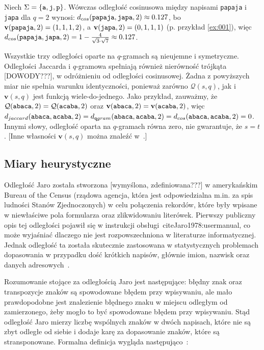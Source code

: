 \documentclass{praca1}
\begin{document}
\begin{example}
Niech $\Sigma = \{\verb|a|, \verb|j|, \verb|p|\}$. Wówczas odległość cosinusowa między napisami \verb|papaja| i \verb|japa| dla $q = 2$ wynosi: $d_{cos}(\verb|papaja|, \verb|japa|, 2) \approx 0.127$, bo $\mathbf{v}( \verb|papaja|,2) = (1, 1, 1, 2)$, a  $\mathbf{v}( \verb|japa|,2) = (0, 1, 1, 1)$ (p. przykład \ref{ex:001}), więc $d_{cos}(\verb|papaja|, \verb|japa|, 2) = 1 - \frac{4}{\sqrt{3}\cdot\sqrt{7}} \approx 0.127$.
\end{example}

Wszystkie trzy odległości oparte na $q$-gramach są nieujemne i symetryczne. Odległości Jaccarda i $q$-gramowa spełniają również nierówność trójkąta [DOWODY???], w odróżnieniu od odległości cosinusowej. Żadna z powyższych miar nie spełnia warunku identyczności, ponieważ zarówno $\mathcal{Q}(s,q)$, jak i $\mathbf{v}(s,q)$ jest funkcją wiele-do-jednego. Jako przykład, zauważmy, że $\mathcal{Q}(\verb|abaca|,2) = \mathcal{Q}(\verb|acaba|,2)$ oraz $\mathbf{v}(\verb|abaca|,2) = \mathbf{v}(\verb|acaba|,2)$, więc $d_{jaccard}(\verb|abaca|, \verb|acaba|, 2) = d_{\mathtt{q}gram}(\verb|abaca|, \verb|acaba|, 2) = d_{cos}(\verb|abaca|, \verb|acaba|, 2) = 0$. Innymi słowy, odległość oparta na $q$-gramach równa zero, nie gwarantuje, że $s = t$. [Inne własności $\mathbf{v}(s,q)$ można znaleźć w~\cite{Ukkonen1992:approxqgrams}.]


\subsection{Miary heurystyczne}

Odległość Jaro została stworzona [wymyślona, zdefiniowana???] w amerykańskim Bureau of the Census (rządowa agencja, która jest odpowiedzialna m.in. za spis ludności Stanów Zjednoczonych) w celu połączenia rekordów, które były wpisane w niewłaściwe pola formularza oraz zlikwidowaniu literówek. Pierwszy publiczny opis tej odległości pojawił się w instrukcji obsługi~cite{Jaro1978:usermanual}, co może wyjaśniać dlaczego nie jest rozpowszechniona w literaturze informatycznej. Jednak odległość ta została skutecznie zastosowana w statystycznych problemach dopasowania w przypadku dość krótkich napisów, głównie imion, nazwisk oraz danych adresowych~\cite{Loo2014:stringdist}.

Rozumowanie stojące za odległością Jaro jest następujące: błędny znak oraz transpozycje znaków są spowodowane błędem przy wpisywaniu, ale mało prawdopodobne jest znalezienie błędnego znaku w miejscu odległym od zamierzonego, żeby mogło to być spowodowane błędem przy wpisywaniu. Stąd odległość Jaro mierzy liczbę wspólnych znaków w dwóch napisach, które nie są zbyt odległe od siebie i dodaje karę za dopasowanie znaków, które są stransponowane. Formalna definicja wygląda następująco~\cite{Loo2014:stringdist}:
\end{document}
